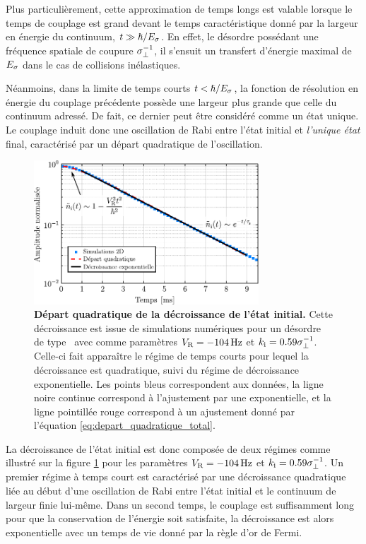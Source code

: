 Plus particulièrement, cette approximation de temps longs est valable lorsque le temps de couplage est grand devant le temps caractéristique donné par la largeur en énergie du continuum, $t\gg\hslash/E_{\sigma}$. En effet, le désordre possédant une fréquence spatiale de coupure $\sigma_{\perp}^{-1}$, il s'ensuit un transfert d'énergie maximal de $E_{\sigma}$ dans le cas de collisions inélastiques.

Néanmoins, dans la limite de temps courts $t<\hslash/E_{\sigma}$, la fonction de résolution en énergie du couplage précédente possède une largeur plus grande que celle du continuum adressé. De fait, ce dernier peut être considéré comme un état unique. Le couplage induit donc une oscillation de Rabi entre l'état initial et \emph{l'unique état} final, caractérisé par un départ quadratique de l'oscillation.

\begin{figure}
\centering
\includegraphics[width=0.75\textwidth]{Fig/TauS_PRL/depart_quadratique_taus.pdf}
\caption{\textbf{Départ quadratique de la décroissance de l'état initial.} Cette décroissance est issue de simulations numériques  pour un désordre de type \speckle\ avec comme paramètres $V_{\mathrm{R}}=\SI{-104}{\hertz}$ et $k_{\mathrm{i}}=0.59\sigma_{\perp}^{-1}$. Celle-ci fait apparaître le régime de temps courts pour lequel la décroissance est quadratique, suivi du régime de décroissance exponentielle. Les points bleus correspondent aux données, la ligne noire continue correspond à l'ajustement par une exponentielle, et la ligne pointillée rouge correspond à un ajustement donné par l'équation \ref{eq:depart_quadratique_total}. }
\label{fig:depart_quadratique_taus}
\end{figure}

La décroissance de l'état initial est donc composée de deux régimes comme illustré sur la figure \ref{fig:depart_quadratique_taus} pour les paramètres $V_{\mathrm{R}}=\SI{-104}{\hertz}$ et $k_{\mathrm{i}}=0.59\sigma_{\perp}^{-1}$. Un premier régime à temps court est caractérisé par une décroissance quadratique liée au début d'une oscillation de Rabi entre l'état initial et le continuum de largeur finie lui-même. Dans un second temps, le couplage est suffisamment long pour que la conservation de l'énergie soit satisfaite, la décroissance est alors exponentielle avec un temps de vie donné par la règle d'or de Fermi.

